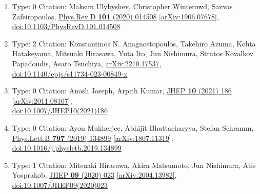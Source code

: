 \documentclass[a4paper,10pt]{article}
\begin{document}
\begin{enumerate}
\begin{enumerate}
  \item Type: 0 Citation: Maksim Ulybyshev, Christopher Winterowd, Savvas Zafeiropoulos, \href{https://www.doi.org/10.1103/PhysRevD.101.014508}{Phys.Rev.D {\bf 101} (2020) 014508}  \href{https://arxiv.org/abs/1906.07678}{[arXiv:1906.07678]},\\\href{https://www.doi.org/10.1103/PhysRevD.101.014508}{doi:10.1103/PhysRevD.101.014508}
  \item Type: 2 Citation: Konstantinos N. Anagnostopoulos, Takehiro Azuma, Kohta Hatakeyama, Mitsuaki Hirasawa, Yuta Ito, Jun Nishimura, Stratos Kovalkov Papadoudis, Asato Tsuchiya, \href{https://arxiv.org/abs/2210.17537}{arXiv:2210.17537},\\\href{https://www.doi.org/10.1140/epjs/s11734-023-00849-x}{doi:10.1140/epjs/s11734-023-00849-x}
  \item Type: 0 Citation: Anosh Joseph, Arpith Kumar, \href{https://www.doi.org/10.1007/JHEP10(2021)186}{JHEP {\bf 10} (2021) 186}  \href{https://arxiv.org/abs/2011.08107}{[arXiv:2011.08107]},\\\href{https://www.doi.org/10.1007/JHEP10(2021)186}{doi:10.1007/JHEP10(2021)186}
  \item Type: 0 Citation: Ayon Mukherjee, Abhijit Bhattacharyya, Stefan Schramm, \href{https://www.doi.org/10.1016/j.physletb.2019.134899}{Phys.Lett.B {\bf 797} (2019) 134899}  \href{https://arxiv.org/abs/1807.11319}{[arXiv:1807.11319]},\\\href{https://www.doi.org/10.1016/j.physletb.2019.134899}{doi:10.1016/j.physletb.2019.134899}
  \item Type: 1 Citation: Mitsuaki Hirasawa, Akira Matsumoto, Jun Nishimura, Atis Yosprakob, \href{https://www.doi.org/10.1007/JHEP09(2020)023}{JHEP {\bf 09} (2020) 023}  \href{https://arxiv.org/abs/2004.13982}{[arXiv:2004.13982]},\\\href{https://www.doi.org/10.1007/JHEP09(2020)023}{doi:10.1007/JHEP09(2020)023}

\end{enumerate}
\end{enumerate}
\end{document}
